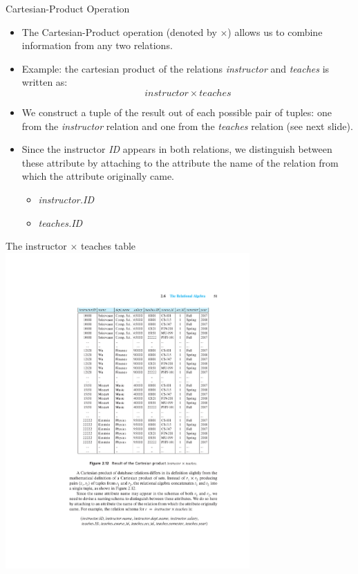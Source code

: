 \documentclass{beamer}
\begin{document}
\begin{frame}{Cartesian-Product Operation}
    \begin{itemize}
        \item The Cartesian-Product operation (denoted by $\times$) allows us to combine information from any two relations.
        \item Example: the cartesian product of the relations \textit{instructor} and \textit{teaches} is written as:
        {\Large
            $$
                instructor \times teaches
            $$
        }
        \item We construct a tuple of the result out of each possible pair of tuples: one from the \textit{instructor} relation and one from the \textit{teaches} relation (see next slide).
        \item Since the instructor \textit{ID} appears in both relations, we distinguish between these attribute by attaching to the attribute the name of the relation from which the attribute originally came.
        \begin{itemize}
            \item \textit{instructor.ID}
            \item \textit{teaches.ID}
        \end{itemize}
    \end{itemize}
\end{frame}

\begin{frame}{The instructor $\times$ teaches table}
    \centering
    \includegraphics[width=0.70\textwidth, trim={6.40cm 10.15cm 3.60cm 4.80cm}, clip]{figures/db_cartesian}
\end{frame}
\end{document}
